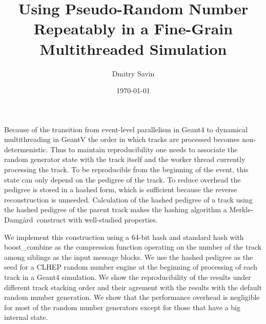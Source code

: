 \documentclass[a4paper, titlepage, 12pt]{article} %
\title{Using Pseudo-Random Number Repeatably in a Fine-Grain Multithreaded Simulation}
\author{Dmitry Savin}
\date{\today}
\newcommand{\MD}{Merkle-Damg\r{a}rd}
\begin{document}
 \maketitle
 
 \abstract
  Because of the transition from event-level parallelism in Geant4 to dynamical multithreading in GeantV the order in which tracks are processed becomes non-determenistic.
  Thus to maintain reproducibility one needs to associate the random generator state with the track itself and the worker thread currently processing the track.
  To be reproducible from the beginning of the event, this state can only depend on the pedigree of the track.
  To reduce overhead the pedigree is stored in a hashed form, which is sufficient because the reverse reconstruction is unneeded.
  Calculation of the hashed pedigree of a track using the hashed pedigree of the parent track makes the hashing algorithm a \MD\ construct with well-studied properties.
  
  We implement this construction using a 64-bit hash and standard hash with boost\_combine as the compression function operating on the number of the track among siblings as the input message blocks.
  We use the hashed pedigree as the seed for a CLHEP random number engine at the beginning of processing of each track in a Geant4 simulation.
  We show the reproducibility of the results under different track stacking order and their agrement with the results with the default random number generation.
  We show that the performance overhead is negligible for most of the random number generators except for those that have a big internal state.
  
 
 
\end{document}
